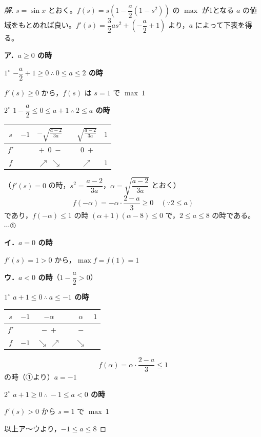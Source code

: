 \documentclass[../main.tex]{subfiles}
\begin{document}
\begin{proof}[解]
  $s=\sin x$ とおく。$f(s)=s\left(1-\dfrac a2(1-s^2)\right)$ の $\max$ が1となる $a$ の値域をもとめれば良い。$f'(s)=\dfrac32as^2+\left(-\dfrac a2+1\right)$ より，$a$ によって下表を得る。

  \textbf{ア．$a\ge0$ の時}

  \textbf{$1^\circ$ $-\dfrac a2+1\ge0\ \therefore\ 0\le a\le2$ の時}

  $f'(s)\ge0$ から，$f(s)$ は $s=1$ で $\max\ 1$

  \textbf{$2^\circ$ $1-\dfrac a2\le0\le a+1\ \therefore\ 2\le a$ の時}

  \begin{center}
    \begin{tabular}{c|c|c|c|c|c}
      $s$ & $-1$ & $-\sqrt{\frac{a-2}{3a}}$ & & $\sqrt{\frac{a-2}{3a}}$ & $1$ \\
      \hline
      $f'$ & & $+$\ $0$\ $-$ & & $0$\ $+$ & \\
      \hline
      $f$ & & $\nearrow\ \searrow$ & & $\nearrow$ & $1$
    \end{tabular}
  \end{center}
  （$f'(s)=0$ の時，$s^2=\dfrac{a-2}{3a}$，$\alpha=\sqrt{\dfrac{a-2}{3a}}$ とおく）
  \[
    f(-\alpha)=-\alpha\cdot\frac{2-a}{3}\ge0 \quad (\because 2\le a)
  \]
  であり，$f(-\alpha)\le1$ の時 $(\alpha+1)(\alpha-8)\le0$ で，$2\le a\le8$ の時である。 $\cdots$①

  \textbf{イ．$a=0$ の時}

  $f'(s)=1>0$ から，$\max f=f(1)=1$

  \textbf{ウ．$a<0$ の時}（$1-\dfrac a2>0$）

  \textbf{$1^\circ$ $a+1\le0\ \therefore\ a\le-1$ の時}

  \begin{center}
    \begin{tabular}{c|c|c|c|c|c}
      $s$ & $-1$ & $-\alpha$ & & $\alpha$ & $1$ \\
      \hline
      $f'$ & & $-$\ $+$ & & $-$ & \\
      \hline
      $f$ & $-1$ & $\searrow\ \nearrow$ & & $\searrow$ &
    \end{tabular}
  \end{center}
  \[
    f(\alpha)=\alpha\cdot\frac{2-a}{3}\le1
  \]
  の時（①より）$a=-1$

  \textbf{$2^\circ$ $a+1\ge0\ \therefore\ -1\le a<0$ の時}

  $f'(s)>0$ から $s=1$ で $\max\ 1$

  以上ア〜ウより，$-1\le a\le8$
\end{proof}
\end{document}
